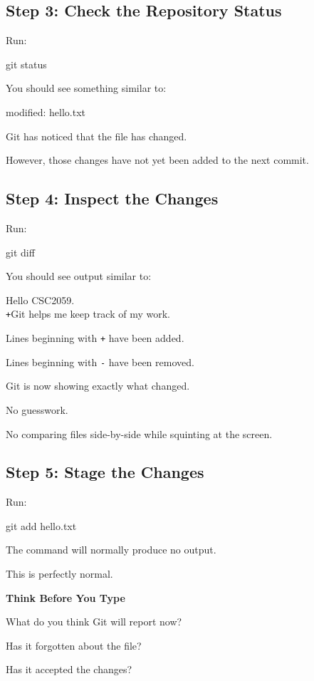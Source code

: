 \documentclass{csc2059practical}
\newcommand{\gitplus}{\textcolor{GitGreen}{\texttt{+}}}
\newcommand{\gitminus}{\textcolor{GitRed}{\texttt{-}}}
\begin{document}
\subsection{Step 3: Check the Repository Status}
Run:

\begin{terminalplain}
git status
\end{terminalplain}
You should see something similar to:

\begin{terminalplain}
\textcolor{GitRed}{modified: hello.txt}
\end{terminalplain}
Git has noticed that the file has changed.

However, those changes have not yet been added to the next commit.

\subsection{Step 4: Inspect the Changes}
Run:

\begin{terminalplain}
git diff
\end{terminalplain}
You should see output similar to:

\begin{terminalplain}
 Hello CSC2059.\\
\gitplus{}\textcolor{GitGreen}{Git helps me keep track of my work.}
\end{terminalplain}

Lines beginning with \gitplus{} have been added.

Lines beginning with \gitminus{} have been removed.

Git is now showing exactly what changed.

No guesswork.

No comparing files side-by-side while squinting at the screen.

\subsection{Step 5: Stage the Changes}
Run:

\begin{terminalplain}
git add hello.txt
\end{terminalplain}
The command will normally produce no output.

This is perfectly normal.

\begin{reflectionbox}
\textbf{Think Before You Type}\par
\medskip

What do you think Git will report now?


Has it forgotten about the file?


Has it accepted the changes?


\end{reflectionbox}
\end{document}
